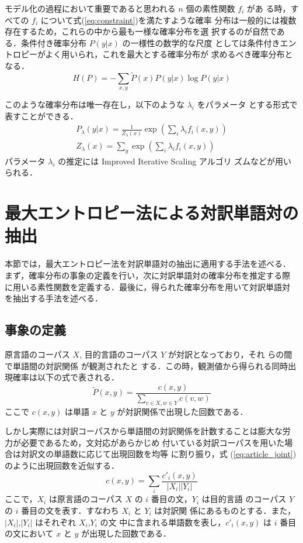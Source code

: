モデル化の過程において重要であると思われる $n$ 個の素性関数 $f_i$ があ
る時，すべての $f_i$ について式(\ref{eq:constraint})を満たすような確率
分布は一般的には複数存在するため，これらの中から最も一様な確率分布を選
択するのが自然である．条件付き確率分布 $P(y|x)$ の一様性の数学的な尺度
としては条件付きエントロピーがよく用いられ，これを最大とする確率分布が
求めるべき確率分布となる．
\begin{equation}
  \label{eq:cond_entropy}
  H(P) = - \sum_{x,y} \tilde{P}(x) P(y|x) \log P(y|x)
\end{equation}

このような確率分布は唯一存在し，以下のような $\lambda_i$ をパラメータ
とする形式で表すことができる．
\begin{eqnarray}
  \label{eq:gibbs}
  P_\lambda(y|x) = \frac{1}{Z_\lambda(x)} \exp \left( \sum_i \lambda_i
  f_i(x,y) \right)\\
  Z_\lambda(x) = \sum_y \exp \left( \sum_i \lambda_i f_i(x,y) \right)
  \nonumber
\end{eqnarray}
パラメータ $\lambda_i$ の推定には Improved Iterative Scaling アルゴリ
ズム\cite{berger_96}などが用いられる．

\section{最大エントロピー法による対訳単語対の抽出}
\label{sec:MEdict}

本節では，最大エントロピー法を対訳単語対の抽出に適用する手法を述べる．
まず，確率分布の事象の定義を行い，次に対訳単語対の確率分布を推定する際
に用いる素性関数を定義する．最後に，得られた確率分布を用いて対訳単語対
を抽出する手法を述べる．

\subsection{事象の定義}
\label{sec:problem_setting}

原言語のコーパス $X$, 目的言語のコーパス $Y$ が対訳となっており，それ
らの間で単語間の対訳関係
が観測されたと
する．この時，観測値から得られる同時出現確率は以下の式で表される．
\begin{equation}
  \label{eq:em_joint}
  \tilde{P}(x,y) = \frac{c(x,y)}{\sum_{v \in X, w \in Y} c(v,w)}
\end{equation}
ここで $c(x,y)$ は単語 $x$ と $y$ が対訳関係で出現した回数である．

しかし実際には対訳コーパスから単語間の対訳関係を計数することは膨大な労
力が必要であるため，文対応があらかじめ
付いている対訳コーパスを用いた場合は対訳文の単語数に応じて出現回数を均等
に割り振り，式 (\ref{eq:article_joint}) のように出現回数を近似する．
\begin{equation}
  \label{eq:article_joint}
  c(x,y) = \sum_i \frac{c'_i(x,y)}{|X_i| |Y_i|}
\end{equation}
ここで，$X_i$ は原言語のコーパス $X$ の $i$ 番目の文，$Y_i$ は目的言語
のコーパス $Y$ の $i$ 番目の文を表す．すなわち $X_i$ と $Y_i$ は対訳関
係にあるものとする．また，$|X_i|$,$|Y_i|$ はそれぞれ $X_i$,$Y_i$ の文
中に含まれる単語数を表し，$c'_i(x,y)$ は $i$ 番目の文において $x$ と
$y$ が出現した回数である．

